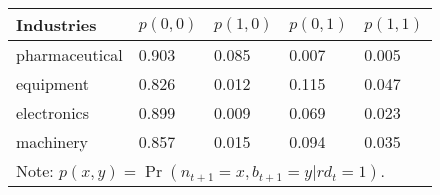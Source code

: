 \begin{tabular}{lllll}
\toprule
Industries     & $p(0,0)$& $p(1,0)$& $p(0,1)$ & $p(1,1)$ \\
\midrule
pharmaceutical & 0.903 & 0.085 & 0.007 & 0.005  \\
equipment      & 0.826 & 0.012 & 0.115 & 0.047 \\
electronics    & 0.899 & 0.009 & 0.069 & 0.023 \\
machinery      & 0.857 & 0.015 & 0.094 & 0.035 \\
\bottomrule
\multicolumn{5}{l}{\footnotesize Note: $p(x,y)=\Pr(n_{t+1}=x, b_{t+1}=y|rd_{t}=1)$.}
\end{tabular}